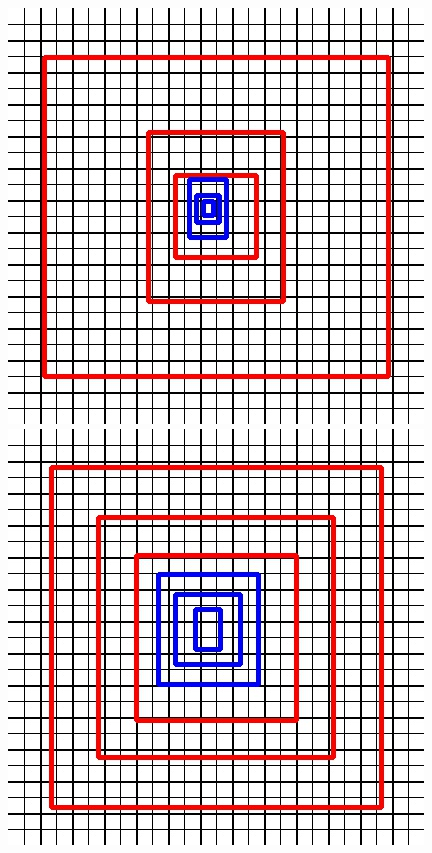 \begin{figure}[hbtp]
	\centering
	\begin{minipage}{0.3\textwidth}
		\includegraphics[width=\textwidth]{fig/yolov3_anchors}
	\end{minipage}
	\begin{minipage}{0.3\textwidth}
		\includegraphics[width=\textwidth]{fig/gate_anchors}

\end{minipage}
\end{figure}
